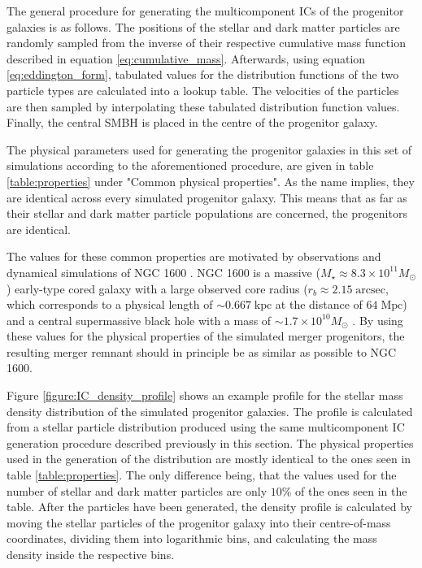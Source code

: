 \documentclass[english, twoside]{HYgradu}
\begin{document}
The general procedure for generating the multicomponent ICs of the progenitor galaxies is as follows. The positions of the stellar and dark matter particles are randomly sampled from the inverse of their respective cumulative mass function described in equation \ref{eq:cumulative_mass}. Afterwards, using equation \ref{eq:eddington_form}, tabulated values for the distribution functions of the two particle types are calculated into a lookup table. The velocities of the particles are then sampled by interpolating these tabulated distribution function values. Finally, the central SMBH is placed in the centre of the progenitor galaxy.

The physical parameters used for generating the progenitor galaxies in this set of simulations according to the aforementioned procedure, are given in table \ref{table:properties} under "Common physical properties". As the name implies, they are identical across every simulated progenitor galaxy. This means that as far as their stellar and dark matter particle populations are concerned, the progenitors are identical. 

The values for these common properties are motivated by observations and dynamical simulations of NGC 1600 \citep{Rantala2018}. NGC 1600 is a massive ($M_\star \approx 8.3 \times 10^{11} M_\odot$) early-type cored galaxy with a large observed core radius ($r_b \approx 2.15 \; \mathrm{arcsec}$, which corresponds to a physical length of $\sim 0.667 \; \mathrm{kpc}$ at the distance of $64 \; \mathrm{Mpc}$) and a central supermassive black hole with a mass of $\sim 1.7 \times 10^{10} M_\odot$ \citep{Thomas2016}. By using these values for the physical properties of the simulated merger progenitors, the resulting merger remnant should in principle be as similar as possible to NGC 1600.

Figure \ref{figure:IC_density_profile} shows an example profile for the stellar mass density distribution of the simulated progenitor galaxies. The profile is calculated from a stellar particle distribution produced using the same multicomponent IC generation procedure described previously in this section. The physical properties used in the generation of the distribution are mostly identical to the ones seen in table \ref{table:properties}. The only difference being, that the values used for the number of stellar and dark matter particles are only $10 \%$  of the ones seen in the table. After the particles have been generated, the density profile is calculated by moving the stellar particles of the progenitor galaxy into their centre-of-mass coordinates, dividing them into logarithmic bins, and calculating the mass density inside the respective bins.
\end{document}
